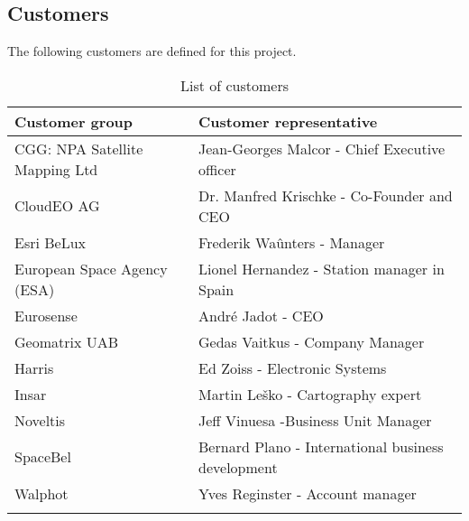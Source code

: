 \subsection{Customers}

{The following customers are defined for this project.}
\begin{longtable}{ll}
	
	\toprule[2pt]
	
	\textbf{Customer group}    & \textbf{Customer representative}
	\\ \midrule[1.5pt]
	
	CGG: NPA Satellite Mapping Ltd & Jean-Georges Malcor - Chief Executive officer\\
	CloudEO AG & Dr. Manfred Krischke - Co-Founder and CEO\\
	Esri BeLux & Frederik Waûnters - Manager\\
	European Space Agency (ESA) & Lionel Hernandez - Station manager in Spain\\
	Eurosense&André Jadot - CEO\\
	Geomatrix UAB & Gedas Vaitkus - Company Manager\\
	Harris&Ed Zoiss - Electronic Systems\\
	Insar&Martin Leško - Cartography expert\\
	Noveltis&Jeff Vinuesa -Business Unit Manager\\
	SpaceBel&Bernard Plano - International business development\\
	Walphot&Yves Reginster - Account manager
	\\ \bottomrule[2pt]
	
	\caption{List of customers}
	\label{table_customers}
\end{longtable}